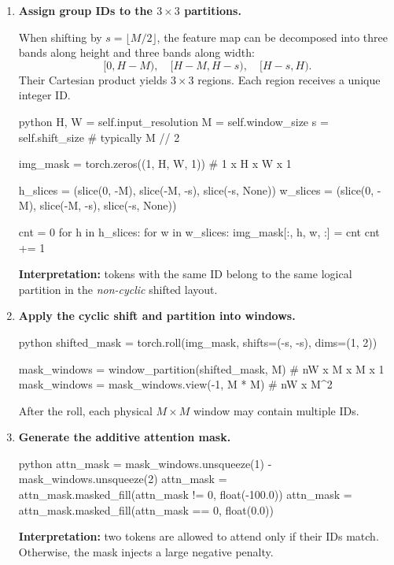 \begin{enumerate}
	\item \textbf{Assign group IDs to the \(3 \times 3\) partitions.}
	
	When shifting by \(s = \lfloor M/2 \rfloor\),
	the feature map can be decomposed into three bands along height
	and three bands along width:
	\[
	[0, H{-}M),\quad [H{-}M, H{-}s),\quad [H{-}s, H).
	\]
	Their Cartesian product yields \(3 \times 3\) regions.
	Each region receives a unique integer ID.
	
	\begin{mintedbox}{python}
		H, W = self.input_resolution
		M = self.window_size
		s = self.shift_size  # typically M // 2
		
		img_mask = torch.zeros((1, H, W, 1))  # 1 x H x W x 1
		
		h_slices = (slice(0, -M),
		slice(-M, -s),
		slice(-s, None))
		w_slices = (slice(0, -M),
		slice(-M, -s),
		slice(-s, None))
		
		cnt = 0
		for h in h_slices:
		    for w in w_slices:
		        img_mask[:, h, w, :] = cnt
		        cnt += 1
	\end{mintedbox}
	
	\noindent
	\textbf{Interpretation:}
	tokens with the same ID belong to the same logical partition
	in the \emph{non-cyclic} shifted layout.
	
	\item \textbf{Apply the cyclic shift and partition into windows.}
	
	\begin{mintedbox}{python}
		shifted_mask = torch.roll(img_mask, shifts=(-s, -s), dims=(1, 2))
		
		mask_windows = window_partition(shifted_mask, M)  # nW x M x M x 1
		mask_windows = mask_windows.view(-1, M * M)       # nW x M^2
	\end{mintedbox}
	
	\noindent
	After the roll, each physical \(M \times M\) window may contain
	multiple IDs.
	
	\item \textbf{Generate the additive attention mask.}
	
	\begin{mintedbox}{python}
		attn_mask = mask_windows.unsqueeze(1) - mask_windows.unsqueeze(2)
		attn_mask = attn_mask.masked_fill(attn_mask != 0, float(-100.0))
		attn_mask = attn_mask.masked_fill(attn_mask == 0, float(0.0))
	\end{mintedbox}
	
	\noindent
	\textbf{Interpretation:}
	two tokens are allowed to attend only if their IDs match.
	Otherwise, the mask injects a large negative penalty.
\end{enumerate}

